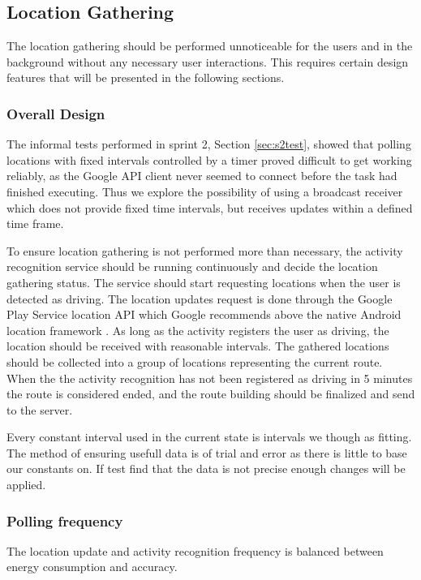 \subsection{Location Gathering}\label{section:s3locgath}
The location gathering should be performed unnoticeable for the users and in the background without any necessary user interactions. 
This requires certain design features that will be presented in the following sections. 


\subsubsection{Overall Design}
The informal tests performed in sprint 2, Section \ref{sec:s2test}, showed that polling locations with fixed intervals controlled by a timer proved difficult to get working reliably, as the Google API client never seemed to connect before the task had finished executing. 
Thus we explore the possibility of using a broadcast receiver which does not provide fixed time intervals, but receives updates within a defined time frame.

To ensure location gathering is not performed more than necessary, the activity recognition service should be running continuously and decide the location gathering status.
The service should start requesting locations when the user is detected as driving. 
The location updates request is done through the Google Play Service location API which Google recommends above the native Android location framework \cite{apploc}.
As long as the activity registers the user as driving, the location should be received with reasonable intervals.
The gathered locations should be collected into a group of locations representing the current route.
When the the activity recognition has not been registered as driving in 5 minutes the route is considered ended, and the route building should be finalized and send to the server.


Every constant interval used in the current state is intervals we though as fitting.
The method of ensuring usefull data is of trial and error as there is little to base our constants on.
If test find that the data is not precise enough changes will be applied.

\subsubsection{Polling frequency}
The location update and activity recognition frequency is balanced between energy consumption and accuracy.

